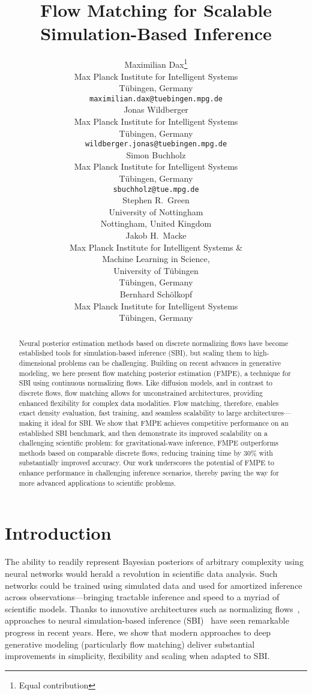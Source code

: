 \documentclass{article}
\title{Flow Matching for Scalable Simulation-Based Inference}
\author{%
  Maximilian Dax\thanks{Equal contribution} \\
  Max Planck Institute for Intelligent Systems\\
  Tübingen, Germany \\
\texttt{maximilian.dax@tuebingen.mpg.de} \\
  \And
  Jonas Wildberger\footnotemark[1] \\
  Max Planck Institute for Intelligent Systems\\
  Tübingen, Germany \\
\texttt{wildberger.jonas@tuebingen.mpg.de} \\
  \And
  Simon Buchholz\footnotemark[1] \\
  Max Planck Institute for Intelligent Systems\\
  Tübingen, Germany\\
\texttt{sbuchholz@tue.mpg.de} \\
  \And 
  Stephen R.~Green \\
  \hspace*{1.2cm}University of Nottingham\hspace*{1.2cm} \\ Nottingham, United Kingdom  \\    
  \And
  Jakob H.~Macke\\
  Max Planck Institute for Intelligent Systems \&\\
  Machine Learning in Science, \\University of Tübingen\\
  Tübingen, Germany \\  
  \And
  Bernhard Schölkopf\\
  Max Planck Institute for Intelligent Systems\\
  Tübingen, Germany \\
}
\theoremstyle{remark}
\begin{document}
\maketitle

\begin{abstract}
    Neural posterior estimation methods based on discrete normalizing flows have become established tools for simulation-based inference (SBI), but scaling them to high-dimensional problems can be challenging. Building on recent advances in generative modeling, we here present flow matching posterior estimation (FMPE), a technique for SBI using continuous normalizing flows. Like diffusion models, and in contrast to discrete flows, flow matching allows for unconstrained architectures, providing enhanced flexibility for complex data modalities. Flow matching, therefore, enables exact density evaluation, fast training, and seamless scalability to large architectures---making it ideal for SBI. We show that FMPE achieves competitive performance on an established SBI benchmark, and then demonstrate its improved scalability on a challenging scientific problem: for gravitational-wave inference, FMPE outperforms methods based on comparable discrete flows, reducing training time by 30\% with substantially improved accuracy. Our work underscores the potential of FMPE to enhance performance in challenging inference scenarios, thereby paving the way for more advanced applications to scientific problems.
\end{abstract}



\section{Introduction}
\label{sec:introduction}


The ability to readily represent Bayesian posteriors of arbitrary complexity using neural networks would herald a revolution in scientific data analysis. Such networks could be trained using simulated data and used for amortized inference across observations---bringing tractable inference and speed to a myriad of scientific models. Thanks to innovative architectures such as normalizing flows~\cite{rezende2015variational,papamakarios2019normalizing}, approaches to neural simulation-based inference (SBI)~\cite{Cranmer:2019eaq} have seen remarkable progress in recent years. Here, we show that modern approaches to deep generative modeling (particularly flow matching) deliver substantial improvements in simplicity, flexibility and scaling when adapted to SBI. 
\end{document}
